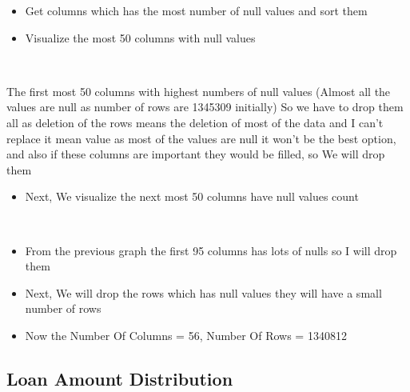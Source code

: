 \documentclass[11pt]{article}
\providecommand{\tightlist}{%
      \setlength{\itemsep}{0pt}\setlength{\parskip}{0pt}}
\begin{document}
\begin{itemize}
\tightlist
\item
  Get columns which has the most number of null values and sort them
\end{itemize}

    \begin{itemize}
\tightlist
\item
  Visualize the most 50 columns with null values
\end{itemize}

    \begin{center}
    \end{center}
    { \hspace*{\fill} \\}
    
    The first most 50 columns with highest numbers of null values (Almost
all the values are null as number of rows are 1345309 initially) So we
have to drop them all as deletion of the rows means the deletion of most
of the data and I can't replace it mean value as most of the values are
null it won't be the best option, and also if these columns are
important they would be filled, so We will drop them

    \begin{itemize}
\tightlist
\item
  Next, We visualize the next most 50 columns have null values count
\end{itemize}

    \begin{center}
    \end{center}
    { \hspace*{\fill} \\}
    
    \begin{itemize}
\tightlist
\item
  From the previous graph the first 95 columns has lots of nulls so I
  will drop them
\item
  Next, We will drop the rows which has null values they will have a
  small number of rows
\item
  Now the Number Of Columns = 56, Number Of Rows = 1340812
\end{itemize}

    \hypertarget{loan-amount-distribution}{%
\subsection{Loan Amount Distribution}\label{loan-amount-distribution}}
\end{document}
